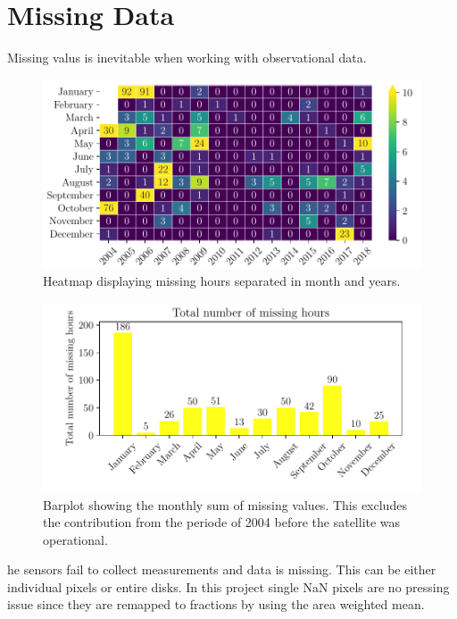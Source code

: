 \section{Missing Data} \label{sec:missing_values}
Missing valus is inevitable when working with observational data. 
\begin{figure}
    \centering
    \includegraphics[scale = 1.0]{python_figs/heatmap_missing_values.pdf}
    \caption[Heatmap showing missing hours for all months or years.]{Heatmap displaying missing hours separated in month and years.}
    \label{fig:heatmap_missing_values}
\end{figure}
\begin{figure}
    \centering
    \includegraphics[scale = 1.0]{python_figs/heatmap_missing_values_monthly_sum.pdf}
    \caption{Barplot showing the monthly sum of missing values. This excludes the contribution from the periode of 2004 before the satellite was operational.}
    \label{fig:barplot_missing_values}
\end{figure}
he sensors fail to collect  measurements and data is missing. This can be either individual pixels or entire disks. In this project single NaN pixels are no pressing issue since they are remapped to fractions by using the area weighted mean. 



